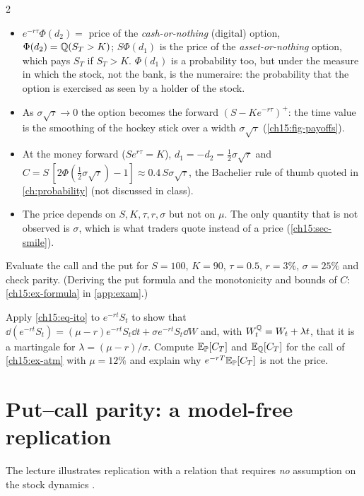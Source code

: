 \begin{paracol}{2}
\begin{intuition}
\begin{itemize}[nosep]
  \item $e^{-r\tau}\Phi(d_2)=$ price of the \emph{cash-or-nothing} (digital) option, $\Phi(d_2)=\mathbb{Q}(S_T>K)$; $S\Phi(d_1)$ is the price of the \emph{asset-or-nothing} option, which pays $S_T$ if $S_T>K$.
        $\Phi(d_1)$ is a probability too, but under the measure in which the stock, not the bank, is the numeraire: the probability that the option is exercised as seen by a holder of the stock.
  \item As $\sigma\sqrt\tau\to0$ the option becomes the forward $(S-Ke^{-r\tau})^+$: the time value is the smoothing of the hockey stick over a width $\sigma\sqrt\tau$ (\cref{ch15:fig-payoffs}).
  \item At the money forward ($Se^{r\tau}=K$), $d_1=-d_2=\tfrac12\sigma\sqrt\tau$ and $C=S\,[2\Phi(\tfrac12\sigma\sqrt\tau)-1]\approx0.4\,S\sigma\sqrt\tau$, the Bachelier rule of thumb quoted in \cref{ch:probability} (not discussed in class).
  \item The price depends on $S,K,\tau,r,\sigma$ but not on $\mu$. The only quantity that is not observed is $\sigma$, which is what traders quote instead of a price (\cref{ch15:sec-smile}).
\end{itemize}
\end{intuition}

\begin{exercise}\label{ch15:ex-formula-short}
Evaluate the call and the put for $S=100$, $K=90$, $\tau=0.5$, $r=3\%$, $\sigma=25\%$ and check parity. (Deriving the put formula and the monotonicity and bounds of $C$: \cref{ch15:ex-formula} in \cref{app:exam}.)
\end{exercise}

\begin{exercise}\label{ch15:ex-girsanov}
Apply \eqref{ch15:eq-ito} to $e^{-rt}S_t$ to show that $\dd(e^{-rt}S_t)=(\mu-r)e^{-rt}S_t\dd t+\sigma e^{-rt}S_t\dd W$ and, with $W^{\mathbb{Q}}_t=W_t+\lambda t$, that it is a martingale for $\lambda=(\mu-r)/\sigma$. Compute
$\mathbb{E}_{\mathbb{P}}[C_T]$ and $\mathbb{E}_{\mathbb{Q}}[C_T]$ for the call of \cref{ch15:ex-atm} with $\mu=12\%$ and explain why $e^{-rT}\mathbb{E}_{\mathbb{P}}[C_T]$ is not the price.
\end{exercise}

\section{Put--call parity: a model-free replication}\label{ch15:sec-parity}
The lecture illustrates replication with a relation that requires \emph{no} assumption on the stock dynamics .


\end{paracol}
